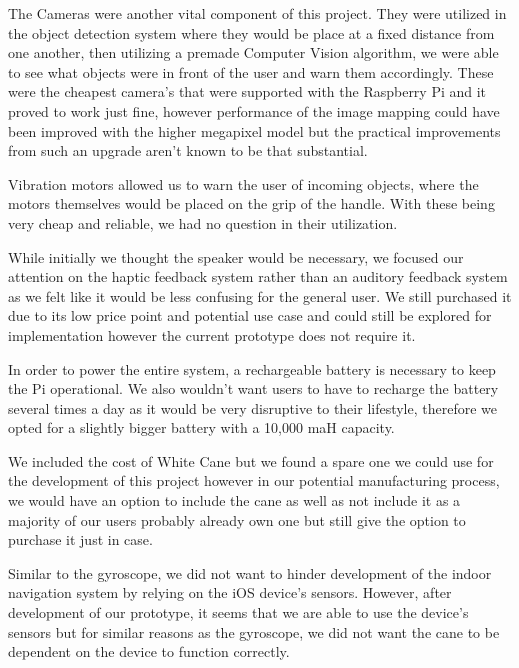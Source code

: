 \documentclass[letterpaper,12pt]{article}
\begin{document}
    The Cameras were another vital component of this project. They were utilized in the object detection system where they would be place at a fixed distance from one another, then utilizing a premade Computer Vision algorithm, we were able to see what objects were in front of the user and warn them accordingly. These were the cheapest camera's that were supported with the Raspberry Pi and it proved to work just fine, however performance of the image mapping could have been improved with the higher megapixel model but the practical improvements from such an upgrade aren't known to be that substantial. \par
    
    Vibration motors allowed us to warn the user of incoming objects, where the motors themselves would be placed on the grip of the handle. With these being very cheap and reliable, we had no question in their utilization. \par
    
    While initially we thought the speaker would be necessary, we focused our attention on the haptic feedback system rather than an auditory feedback system as we felt like it would be less confusing for the general user. We still purchased it due to its low price point and potential use case and could still be explored for implementation however the current prototype does not require it. \par
    
    In order to power the entire system, a rechargeable battery is necessary to keep the Pi operational. We also wouldn't want users to have to recharge the battery several times a day as it would be very disruptive to their lifestyle, therefore we opted for a slightly bigger battery with a 10,000 maH capacity. \par
    
    We included the cost of White Cane but we found a spare one we could use for the development of this project however in our potential manufacturing process, we would have an option to include the cane as well as not include it as a majority of our users probably already own one but still give the option to purchase it just in case. \par 
    
    Similar to the gyroscope, we did not want to hinder development of the indoor navigation system by relying on the iOS device's sensors. However, after development of our prototype, it seems that we are able to use the device's sensors but for similar reasons as the gyroscope, we did not want the cane to be dependent on the device to function correctly.
    
\end{document}
